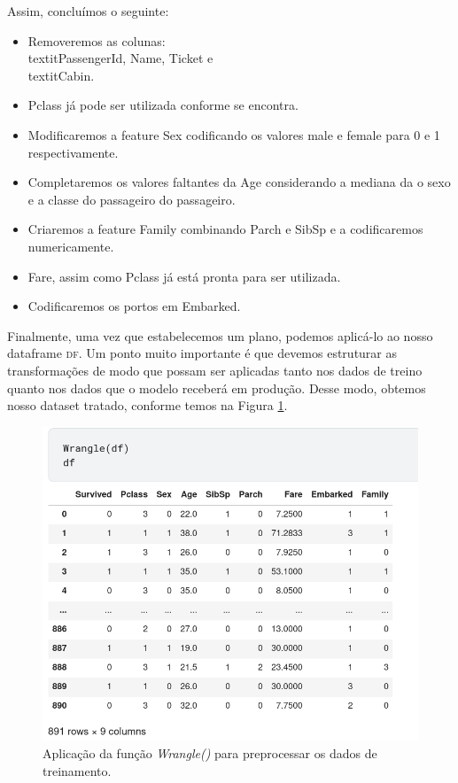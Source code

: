 Assim, concluímos o seguinte:
\begin{itemize}
\item Removeremos as colunas: \\textit{PassengerId, Name, Ticket} e \\textit{Cabin}. 
\item Pclass já pode ser utilizada conforme se encontra.
\item Modificaremos a feature Sex codificando os valores male e female para 0 e 1 respectivamente. 
\item Completaremos os valores faltantes da Age considerando a mediana da o sexo e a classe do passageiro do passageiro. 
\item Criaremos a feature Family combinando Parch e SibSp e a codificaremos numericamente. 
\item Fare, assim como Pclass já está pronta para ser utilizada. 
\item Codificaremos os portos em Embarked.
\end{itemize}

Finalmente, uma vez que estabelecemos um plano, podemos aplicá-lo ao nosso dataframe \textsc{df}. Um ponto muito importante é que devemos estruturar as transformações de modo que possam ser aplicadas tanto nos dados de treino quanto nos dados que o modelo receberá em produção. Desse modo, obtemos nosso dataset tratado, conforme temos na Figura \ref{wranglin.results}.

\begin{figure}[H]
\centering
\includegraphics[width=\textwidth]{Figures/wrangle_results.png}
\caption{\label{wranglin.results}Aplicação da função \emph{Wrangle()} para preprocessar os dados de treinamento.}
\end{figure}

